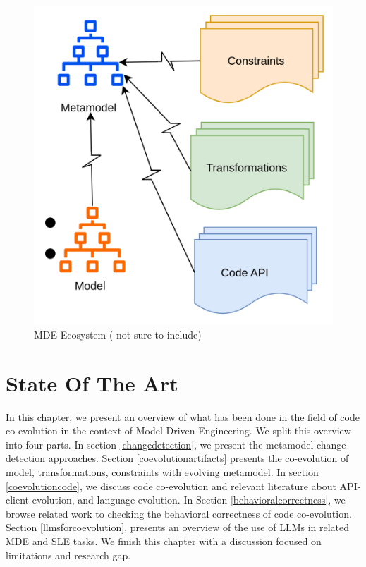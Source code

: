 \begin{figure}[htbp]
	\begin{center}
		\includegraphics[width=0.6\linewidth]{./pics/soaPics/mdeecosystem.png}
	\end{center}
	\caption{MDE Ecosystem ( not sure to include)}
	\label{fig:mde_ecosystem}
\end{figure}


\chapter{State Of The Art}

In this chapter, we present an overview of what has been done in the field of code co-evolution in the context of Model-Driven Engineering. We split this overview into four  parts. In section \ref{changedetection}, we present the metamodel change detection approaches. Section \ref{coevolutionartifacts} presents the co-evolution of model, transformations, constraints with evolving metamodel. In section \ref{coevolutioncode}, we discuss code co-evolution and relevant literature about API-client evolution, and language evolution. In Section \ref{behavioralcorrectness}, we browse related work to checking the behavioral correctness of code co-evolution. Section \ref{llmsforcoevolution}, presents an overview of the use of LLMs in related MDE and SLE tasks. We finish this chapter with a discussion focused on limitations and research gap.
